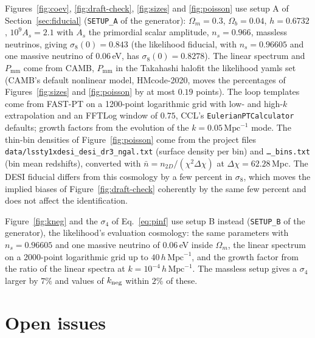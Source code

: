 \documentclass[11pt]{article}
\newcommand{\pnl}{P_{\mathrm{mm}}}
\newcommand{\hMpc}{\,h\,\mathrm{Mpc}^{-1}}
\begin{document}
Figures~\ref{fig:coev}, \ref{fig:draft-check}, \ref{fig:sizes} and
\ref{fig:poisson} use setup A of Section~\ref{sec:fiducial}
(\texttt{SETUP\_A} of the generator): $\Omega_m = 0.3$,
$\Omega_b = 0.04$, $h = 0.6732$, $10^9 A_s = 2.1$ with $A_s$ the
primordial scalar amplitude, $n_s = 0.966$, massless neutrinos, giving
$\sigma_8(0) = 0.843$ (the likelihood fiducial, with $n_s = 0.96605$
and one massive neutrino of $0.06$\,eV, has $\sigma_8(0) = 0.8278$).  The linear spectrum and $\pnl$ come from CAMB,
$\pnl$ in the Takahashi halofit the likelihood yamls set (CAMB's
default nonlinear model, HMcode-2020, moves the percentages of
Figures~\ref{fig:sizes} and \ref{fig:poisson} by at most $0.19$
points).  The loop templates come from FAST-PT on a 1200-point
logarithmic grid with low- and high-$k$ extrapolation and an FFTLog
window of $0.75$, CCL's \texttt{EulerianPTCalculator} defaults; growth
factors from the evolution of the $k = 0.05\,\mathrm{Mpc}^{-1}$ mode.
The thin-bin densities of Figure~\ref{fig:poisson} come from the
project files \texttt{data/lssty1xdesi\_desi\_dr3\_ngal.txt} (surface
density per bin) and \texttt{\ldots\_bins.txt} (bin mean redshifts),
converted with $\bar{n} = n_{2D}/(\chi^2\Delta\chi)$ at
$\Delta\chi = 62.28$\,Mpc.  The DESI fiducial differs from this
cosmology by a few percent in $\sigma_8$, which moves the implied
biases of Figure~\ref{fig:draft-check} coherently by the same few
percent and does not affect the identification.

Figure~\ref{fig:kneg} and the $\sigma_4$ of Eq.~\eqref{eq:pinf} use
setup B instead (\texttt{SETUP\_B} of the generator), the likelihood's
evaluation cosmology: the same parameters
with $n_s = 0.96605$ and one massive neutrino of $0.06$\,eV inside
$\Omega_m$, the linear spectrum on a 2000-point logarithmic grid up to
$40\hMpc$, and the growth factor from the ratio of the linear spectra
at $k = 10^{-4}\hMpc$.  The massless setup gives a $\sigma_4$ larger
by $7\%$ and values of $k_{\rm neg}$ within $2\%$ of these.

\section{Open issues}
\label{app:open}
\end{document}
